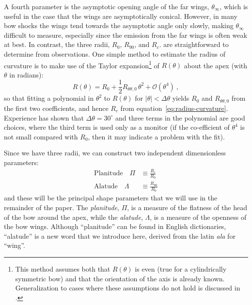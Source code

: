 A fourth parameter is the asymptotic opening angle of the far wings,
\(\theta_\infty\), which is useful in the case that the wings are asymptotically
conical.  However, in many bow shocks the wings tend towards the
asymptotic angle only slowly, making \(\theta_\infty\) difficult to measure,
especially since the emission from the far wings is often weak at
best.  In contrast, the three radii, \(R_0\), \(R_{90}\), and
\(R_c\). are straightforward to determine from observations.  One
simple method to estimate the radius of curvature is to make use of
the Taylor expansion\footnote{%
  This method assumes both that \(R(\theta)\) is even (true for a
  cylindrically symmetric bow) and that the orientation of the axis is
  already known.  Generalization to cases where these assumptions do
  not hold is discussed in \citet{Henney:2017a}.} %
of \(R(\theta)\) about the apex (with \(\theta\) in
radians):
\begin{equation}
  \label{eq:taylor-R-theta}
  R(\theta) = R_0 + \frac12 R_{\theta\theta,0} \,\theta^2 + \mathcal{O}(\theta^4) \ ,
\end{equation}
so that fitting a polynomial in \(\theta^2\) to \(R(\theta)\) for
\(|\theta| < \Delta\theta \) yields \(R_0\) and \(R_{\theta\theta,0}\) from the first two
coefficients, and hence \(R_c\) from
equation~\eqref{eq:radius-curvature}.  Experience has shown that
\(\Delta\theta = 30^\circ\) and three terms in the polynomial are good choices,
where the third term is used only as a monitor (if the co-efficient of
\(\theta^4\) is not small compared with \(R_0\), then it may indicate a
problem with the fit).

Since we have three radii, we can construct two independent
dimensionless parameters:
\begin{align}
  \label{eq:planitude}
  \text{Planitude} \quad \Pi & \equiv  \frac{R_c} {R_0} \\
  \label{eq:alatude}
  \text{Alatude} \quad \Lambda & \equiv  \frac{R_{90}} {R_0}
\end{align}
and these will be the principal shape parameters that we will use in
the remainder of the paper.  The \textit{planitude}, \(\Pi\), is a
measure of the flatness of the head of the bow around the apex, while
the \textit{alatude}, \(\Lambda\), is a measure of the openness of the bow
wings.  Although ``planitude'' can be found in English dictionaries,
``alatude'' is a new word that we introduce here, derived from the
latin \textit{ala} for ``wing''.

